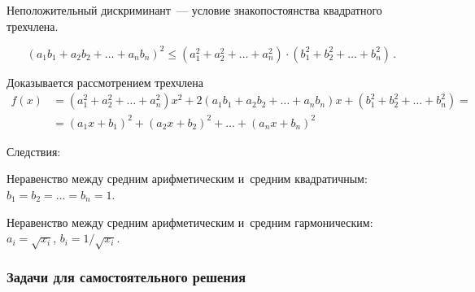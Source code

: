 


\begingroup
    \def\abs#1{\lvert #1 \rvert}%

Неположительный дискриминант~--- условие знакопостоянства квадратного
трехчлена.

\[
    (a_{1} b_{1} + a_{2} b_{2} + \ldots + a_{n} b_{n})^2
\leq
    (a_{1}^2 + a_{2}^2 + \ldots + a_{n}^2)
    \cdot
    (b_{1}^2 + b_{2}^2 + \ldots + b_{n}^2)
\, . \]

Доказывается рассмотрением трехчлена
\begin{align*}
    f(x)
& =
    (a_{1}^2 + a_{2}^2 + \ldots + a_{n}^2) x^2
    +
    2 (a_{1} b_{1} + a_{2} b_{2} + \ldots + a_{n} b_{n}) x
    +
    (b_{1}^2 + b_{2}^2 + \ldots + b_{n}^2)
= \\ & =
    (a_{1} x + b_{1})^2 + (a_{2} x + b_{2})^2 + \ldots + (a_{n} x + b_{n})^2
\end{align*}

Следствия:
\begin{exercises}
\item
Неравенство между средним арифметическим и~средним квадратичным:
$b_{1} = b_{2} =  \ldots = b_{n} = 1$.
\item
Неравенство между средним арифметическим и~средним гармоническим:
$a_{i} = \sqrt{x_{i}}$, $b_{i} = 1 / \sqrt{x_{i}}$.
\end{exercises}


\subsubsection*{Задачи для самостоятельного решения}

